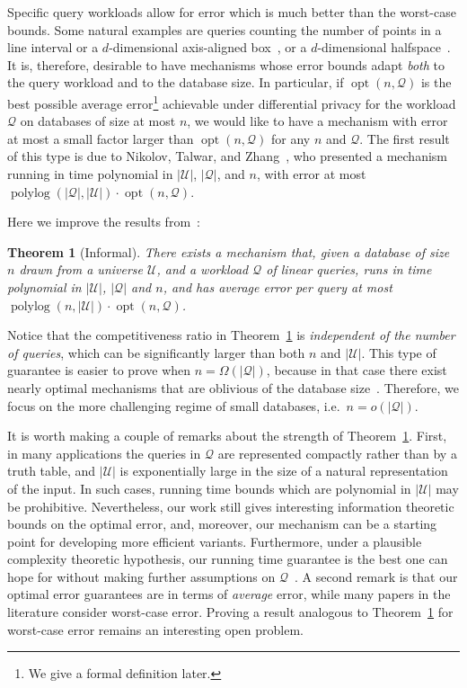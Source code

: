 \documentclass{article}
\newtheorem{theorem}{Theorem}[section]
\newcommand{\univ}{U}
\DeclareMathOperator{\opt}{opt}
\DeclareMathOperator{\polylog}{polylog}
\renewcommand{\univ}{\mathcal{U}}
\newcommand{\quer}{\mathcal{Q}}
\begin{document}
Specific query workloads allow for error which is much better than the
worst-case bounds. Some natural examples are queries counting the
number of points in a line interval or a $d$-dimensional axis-aligned
box~\cite{dwork-continual,ChanSS10,XiaoWG10}, or a $d$-dimensional
halfspace~\cite{halfspaces}. It is, therefore, desirable to have
mechanisms whose error bounds adapt \emph{both} to the query workload
and to the database size. In particular, if $\opt(n, \quer)$ is the
best possible average error\footnote{We give a formal definition later.}
achievable under differential privacy for the workload $\quer$ on
databases of size at most $n$, we would like to have a mechanism with
error at most a small factor larger than $\opt(n,\quer)$ for any $n$
and $\quer$. The first result of this type is due to Nikolov, Talwar,
and Zhang~\cite{NTZ}, who presented a mechanism running in time
polynomial in $|\univ|$, $|\quer|$, and $n$, with error at most
$\polylog(|\quer|, |\univ|)\cdot\opt(n,\quer)$.

Here we improve the results from~\cite{NTZ}:
\begin{theorem}[Informal]\label{thm:main}
  There exists a mechanism that, given a database of size $n$ drawn
  from a universe $\univ$, and a workload $\quer$ of linear queries,
  runs in time polynomial in $|\univ|$, $|\quer|$ and $n$, and has
  average error per query at most $\polylog(n, |\univ|)\cdot \opt(n,\quer)$.
\end{theorem}

Notice that the competitiveness ratio in Theorem~\ref{thm:main} is
\emph{independent of the number of queries}, which can be
significantly larger than both $n$ and $|\univ|$. This type of
guarantee is easier to prove when $n = \Omega(|\quer|)$, because in that case
there exist nearly optimal mechanisms that are oblivious of the
database size~\cite{NTZ}. Therefore, we focus on the more
challenging regime of small databases, i.e.~$n = o(|\quer|)$. 

It is worth making a couple of remarks about the strength of
Theorem~\ref{thm:main}. First, in many applications the queries in
$\quer$ are represented compactly rather than by a truth table, and
$|\univ|$ is exponentially large in the size of a natural
representation of the input. In such cases, running time bounds which
are polynomial in $|\univ|$ may be prohibitive. Nevertheless, our work
still gives interesting information theoretic bounds on the optimal
error, and, moreover, our mechanism can be a starting point for
developing more efficient variants. Furthermore, under a plausible
complexity theoretic hypothesis, our running time guarantee is the
best one can hope for without making further assumptions on
$\quer$~\cite{Ullman13}. A second remark is that our optimal error
guarantees are in terms of \emph{average} error, while many papers in
the literature consider worst-case error. Proving a result analogous
to Theorem~\ref{thm:main} for worst-case error remains an interesting
open problem.
\end{document}
